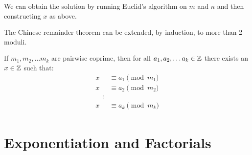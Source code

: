 \documentclass[../main.tex]{subfiles}
\begin{document}
\begin{remark}[Note]
  We can obtain the solution by running Euclid's algorithm on $m$ and $n$ and then constructing $x$ as above.
\end{remark}
\begin{remark}
  The Chinese remainder theorem can be extended, by induction, to more than 2 moduli.

  If $m_1, m_2, \ldots m_k$ are pairwise coprime, then for all $a_1, a_2, \ldots a_k \in \mathbb{Z}$ there exists an $x \in \mathbb{Z}$ such that:
  \begin{align*}
    x &\equiv a_1 \pmod{m_1} \\
    x &\equiv a_2 \pmod{m_2} \\
    \quad\vdots \\
    x &\equiv a_k \pmod{m_k} \\
  \end{align*}
\end{remark}
\section{Exponentiation and Factorials}
\end{document}
